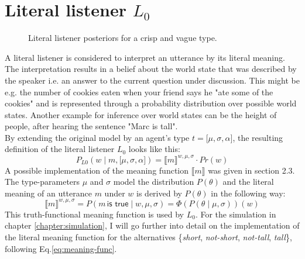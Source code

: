\section{Literal listener $L_0$}
\begin{figure}[h]
 	\centering
 \caption{Literal listener posteriors for a crisp and vague type.}
 \label{figure:L0-posterior}
\end{figure}
A literal listener is considered to interpret an utterance by its literal meaning. The interpretation results in a belief about the world state that was described by the speaker i.e. an answer to the current question under discussion. 
This might be e.g. the number of cookies eaten when your friend says he "ate some of the cookies" and is represented through a probability distribution over possible world states.
Another example for inference over world states can be the height of people, after hearing the sentence "Marc is tall".\\

By extending the original model by an agent's type $t = \big[ \mu, \sigma, \alpha\big]$, the resulting definition of the literal listener $L_0$ looks like this:
\begin{equation}
P_{L0}(w \mid m , \big[ \mu, \sigma, \alpha\big]) = \llbracket m \rrbracket^{w,\mu,\sigma} \cdot Pr(w) 
\end{equation}
A possible implementation of the meaning function $\llbracket m \rrbracket$ was given in section 2.3. The type-parameters $\mu$ and $\sigma$ model the distribution $P(\theta)$ and the literal meaning of an utterance $m$ under $w$ is derived by $P(\theta)$ in the following way:
\begin{equation}
\llbracket m \rrbracket^{w,\mu,\sigma} = P(m \, \textsf{is true} \mid w, \mu, \sigma) = \Phi(P(\theta \mid \mu, \sigma))(w)
\label{eq:meaning-func}
\end{equation}
This truth-functional meaning function is used by $L_0$. For the simulation in chapter \ref{chapter:simulation}, I will go further into detail on the implementation of the literal meaning function for the alternatives \{\textit{short}, \textit{not-short}, \textit{not-tall}, \textit{tall}\}, following Eq.\ref{eq:meaning-func}.\\


